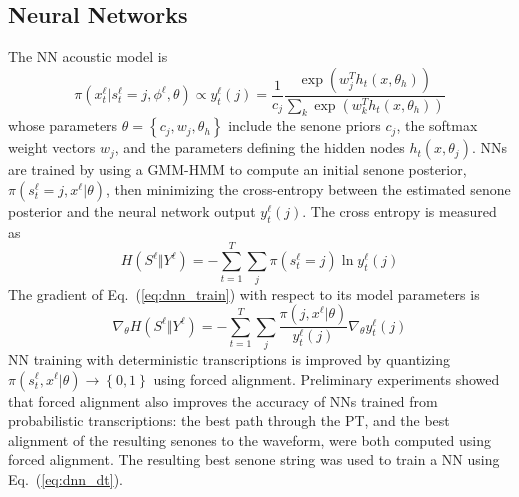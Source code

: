 \subsection{Neural Networks}

The NN acoustic model is
\[
\pi(x_t^\ell|s_t^\ell =j,\phi^\ell,\theta)\propto
y_t^\ell(j)=\frac{1}{c_j}\frac{\exp\left(w_j^Th_t(x,\theta_h)\right)}
{\sum_k \exp\left(w_k^Th_t(x,\theta_h)\right)}
\]
whose parameters $\theta=\left\{c_j,w_j,\theta_h\right\}$ include the
senone priors $c_j$, the softmax weight vectors $w_j$, and the
parameters defining the hidden nodes $h_t(x,\theta_j)$.  NNs are
trained by using a GMM-HMM to compute an initial senone posterior,
$\pi(s_t^\ell=j,x^\ell|\theta)$, then minimizing the cross-entropy
between the estimated senone posterior and the neural network output
$y_{t}^\ell(j)$.  The cross entropy is measured as
\begin{equation}
  H(S^\ell\Vert Y^\ell)=-\sum_{t=1}^T \sum_{j} \pi(s_t^\ell=j) \ln y_{t}^\ell(j)
  \label{eq:dnn_train}
\end{equation}
The gradient of Eq.~(\ref{eq:dnn_train}) with respect to its model
parameters is
\begin{equation}
  \nabla_\theta H(S^\ell\Vert Y^\ell)=-
  \sum_{t=1}^T\sum_j\frac{\pi(j,x^\ell|\theta)}{y_t^\ell(j)}
  \nabla_\theta y_t^\ell(j)
  \label{eq:dnn_dt}
\end{equation}
NN training with deterministic transcriptions is improved by
quantizing $\pi(s_t^\ell,x^\ell|\theta)\rightarrow\left\{0,1\right\}$
using forced alignment. Preliminary experiments showed that forced
alignment also improves the accuracy of NNs trained from probabilistic
transcriptions: the best path through the PT, and the best alignment
of the resulting senones to the waveform, were both computed using
forced alignment.  The resulting best senone string was used to train
a NN using Eq.~(\ref{eq:dnn_dt}).

